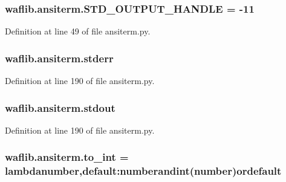 \subsubsection[{\texorpdfstring{S\+T\+D\+\_\+\+O\+U\+T\+P\+U\+T\+\_\+\+H\+A\+N\+D\+LE}{STD_OUTPUT_HANDLE}}]{ waflib.\+ansiterm.\+S\+T\+D\+\_\+\+O\+U\+T\+P\+U\+T\+\_\+\+H\+A\+N\+D\+LE = -\/11}\hypertarget{namespacewaflib_1_1ansiterm_a3eaf6a851a6729c250d7a9280efb4821}{}\label{namespacewaflib_1_1ansiterm_a3eaf6a851a6729c250d7a9280efb4821}


Definition at line 49 of file ansiterm.\+py.

\subsubsection[{\texorpdfstring{stderr}{stderr}}]{\setlength{\rightskip}{0pt plus 5cm}waflib.\+ansiterm.\+stderr}\hypertarget{namespacewaflib_1_1ansiterm_a44bedfddf1392d636441272f5f3c95d4}{}\label{namespacewaflib_1_1ansiterm_a44bedfddf1392d636441272f5f3c95d4}


Definition at line 190 of file ansiterm.\+py.

\subsubsection[{\texorpdfstring{stdout}{stdout}}]{\setlength{\rightskip}{0pt plus 5cm}waflib.\+ansiterm.\+stdout}\hypertarget{namespacewaflib_1_1ansiterm_acf95a6e21629de2ca2b5716f5089f3f0}{}\label{namespacewaflib_1_1ansiterm_acf95a6e21629de2ca2b5716f5089f3f0}


Definition at line 190 of file ansiterm.\+py.

\subsubsection[{\texorpdfstring{to\+\_\+int}{to_int}}]{\setlength{\rightskip}{0pt plus 5cm}waflib.\+ansiterm.\+to\+\_\+int = lambdanumber,default\+:numberandint(number)ordefault}\hypertarget{namespacewaflib_1_1ansiterm_a2656c7dab888e042181e8dfbfb2ed8bb}{}\label{namespacewaflib_1_1ansiterm_a2656c7dab888e042181e8dfbfb2ed8bb}


